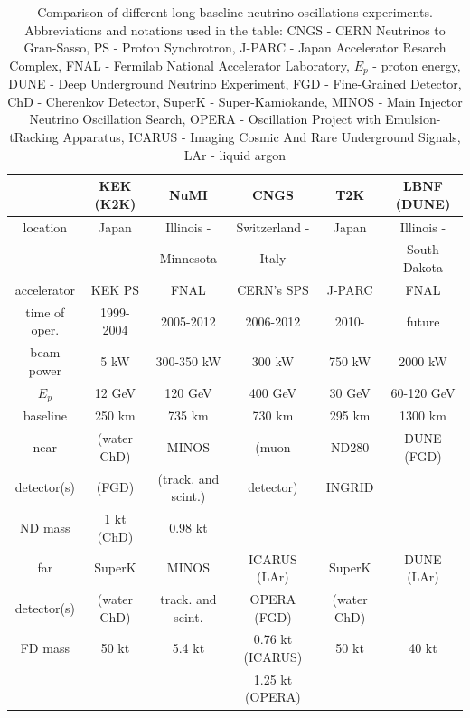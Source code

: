 \begin{table}[h]
  \centering
  \begin{center}
  \caption{ Comparison of different long baseline neutrino oscillations experiments. Abbreviations and notations used in the table: CNGS - CERN Neutrinos to Gran-Sasso, PS - Proton Synchrotron, J-PARC - Japan Accelerator Resarch Complex, FNAL - Fermilab National Accelerator Laboratory, $E_p$ - proton energy, DUNE - Deep Underground Neutrino Experiment, FGD - Fine-Grained Detector, ChD - Cherenkov Detector, SuperK - Super-Kamiokande, MINOS - Main Injector Neutrino Oscillation Search, OPERA - Oscillation Project with Emulsion-tRacking Apparatus, ICARUS - Imaging Cosmic And Rare Underground Signals, LAr - liquid argon }
  \begin{tabular}{|c|c|c|c|c|c|}
              & KEK (K2K) & NuMI & CNGS & T2K & LBNF (DUNE)\\ \hline
     location & Japan  & Illinois - & Switzerland - & Japan & Illinois - \\ 
              &        & Minnesota & Italy &  & South Dakota\\ \hline
     accelerator & KEK PS  & FNAL & CERN's SPS & J-PARC & FNAL\\ \hline
     time of oper. & 1999-2004  & 2005-2012 & 2006-2012 & 2010- & future \\ \hline 
     beam power  &  5 kW  & 300-350 kW  & 300 kW & 750 kW & 2000 kW\\ \hline 
     $E_p$  & 12 GeV & 120 GeV & 400 GeV & 30 GeV & 60-120 GeV\\ \hline 
     baseline  & 250 km & 735 km & 730 km & 295 km & 1300 km\\ \hline 
     near        & (water ChD) & MINOS               & (muon               & ND280       & DUNE (FGD)\\  
     detector(s) & (FGD)       & (track. and scint.) & detector)           & INGRID      & \\ \hline 
     ND mass     & 1 kt (ChD)  & 0.98 kt             &                     &             & \\ \hline 
     far         & SuperK      & MINOS               & ICARUS (LAr)        & SuperK      & DUNE (LAr)\\  
     detector(s) & (water ChD) & track. and scint.   & OPERA (FGD)        & (water ChD) & \\ \hline 
     FD mass     & 50 kt       & 5.4 kt              & 0.76 kt (ICARUS)   & 50 kt       & 40 kt\\ 
                 &             &                     & 1.25 kt (OPERA)    &             & \\ \hline 
 \end{tabular}
  \label{tab:compareExps}
  \end{center}
\end{table}



